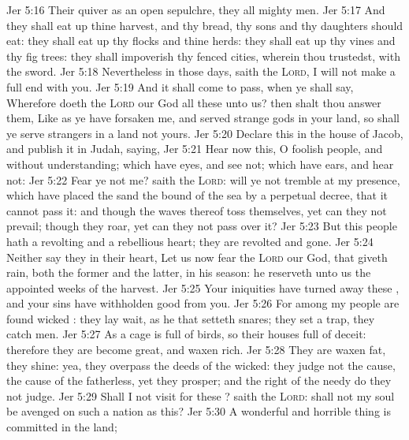 \vs Jer 5:16 Their quiver  as an open sepulchre, they  all mighty men.
\vs Jer 5:17 And they shall eat up thine harvest, and thy bread,  thy sons and thy daughters should eat: they shall eat up thy flocks and thine herds: they shall eat up thy vines and thy fig trees: they shall impoverish thy fenced cities, wherein thou trustedst, with the sword.
\vs Jer 5:18 Nevertheless in those days, saith the \textsc{Lord}, I will not make a full end with you.
\vs Jer 5:19 And it shall come to pass, when ye shall say, Wherefore doeth the \textsc{Lord} our God all these  unto us? then shalt thou answer them, Like as ye have forsaken me, and served strange gods in your land, so shall ye serve strangers in a land  not yours.
\vs Jer 5:20 Declare this in the house of Jacob, and publish it in Judah, saying,
\vs Jer 5:21 Hear now this, O foolish people, and without understanding; which have eyes, and see not; which have ears, and hear not:
\vs Jer 5:22 Fear ye not me? saith the \textsc{Lord}: will ye not tremble at my presence, which have placed the sand  the bound of the sea by a perpetual decree, that it cannot pass it: and though the waves thereof toss themselves, yet can they not prevail; though they roar, yet can they not pass over it?
\vs Jer 5:23 But this people hath a revolting and a rebellious heart; they are revolted and gone.
\vs Jer 5:24 Neither say they in their heart, Let us now fear the \textsc{Lord} our God, that giveth rain, both the former and the latter, in his season: he reserveth unto us the appointed weeks of the harvest.
\vs Jer 5:25 Your iniquities have turned away these , and your sins have withholden good  from you.
\vs Jer 5:26 For among my people are found wicked : they lay wait, as he that setteth snares; they set a trap, they catch men.
\vs Jer 5:27 As a cage is full of birds, so  their houses full of deceit: therefore they are become great, and waxen rich.
\vs Jer 5:28 They are waxen fat, they shine: yea, they overpass the deeds of the wicked: they judge not the cause, the cause of the fatherless, yet they prosper; and the right of the needy do they not judge.
\vs Jer 5:29 Shall I not visit for these ? saith the \textsc{Lord}: shall not my soul be avenged on such a nation as this?
\vs Jer 5:30 A wonderful and horrible thing is committed in the land;
